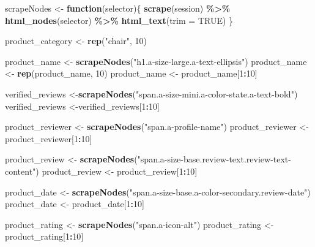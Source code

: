 \documentclass[
]{article}
\newenvironment{Shaded}{\begin{snugshade}}{\end{snugshade}}
\newcommand{\AttributeTok}[1]{\textcolor[rgb]{0.13,0.29,0.53}{#1}}
\newcommand{\ConstantTok}[1]{\textcolor[rgb]{0.56,0.35,0.01}{#1}}
\newcommand{\ControlFlowTok}[1]{\textcolor[rgb]{0.13,0.29,0.53}{\textbf{#1}}}
\newcommand{\DecValTok}[1]{\textcolor[rgb]{0.00,0.00,0.81}{#1}}
\newcommand{\FunctionTok}[1]{\textcolor[rgb]{0.13,0.29,0.53}{\textbf{#1}}}
\newcommand{\NormalTok}[1]{#1}
\newcommand{\OtherTok}[1]{\textcolor[rgb]{0.56,0.35,0.01}{#1}}
\newcommand{\SpecialCharTok}[1]{\textcolor[rgb]{0.81,0.36,0.00}{\textbf{#1}}}
\newcommand{\StringTok}[1]{\textcolor[rgb]{0.31,0.60,0.02}{#1}}
\begin{document}
\begin{Shaded}
\begin{Highlighting}[]
\NormalTok{  scrapeNodes }\OtherTok{\textless{}{-}} \ControlFlowTok{function}\NormalTok{(selector)\{}
    \FunctionTok{scrape}\NormalTok{(session) }\SpecialCharTok{\%\textgreater{}\%}
      \FunctionTok{html\_nodes}\NormalTok{(selector) }\SpecialCharTok{\%\textgreater{}\%}
      \FunctionTok{html\_text}\NormalTok{(}\AttributeTok{trim =} \ConstantTok{TRUE}\NormalTok{)}
\NormalTok{  \}}

\NormalTok{  product\_category }\OtherTok{\textless{}{-}} \FunctionTok{rep}\NormalTok{(}\StringTok{"chair"}\NormalTok{, }\DecValTok{10}\NormalTok{)}

\NormalTok{  product\_name }\OtherTok{\textless{}{-}} \FunctionTok{scrapeNodes}\NormalTok{(}\StringTok{"h1.a{-}size{-}large.a{-}text{-}ellipsis"}\NormalTok{)}
\NormalTok{  product\_name }\OtherTok{\textless{}{-}} \FunctionTok{rep}\NormalTok{(product\_name, }\DecValTok{10}\NormalTok{)}
\NormalTok{  product\_name }\OtherTok{\textless{}{-}}\NormalTok{ product\_name[}\DecValTok{1}\SpecialCharTok{:}\DecValTok{10}\NormalTok{]}
  
\NormalTok{  verified\_reviews }\OtherTok{\textless{}{-}}\FunctionTok{scrapeNodes}\NormalTok{(}\StringTok{"span.a{-}size{-}mini.a{-}color{-}state.a{-}text{-}bold"}\NormalTok{)}
\NormalTok{  verified\_reviews }\OtherTok{\textless{}{-}}\NormalTok{verified\_reviews[}\DecValTok{1}\SpecialCharTok{:}\DecValTok{10}\NormalTok{]}
  
\NormalTok{  product\_reviewer }\OtherTok{\textless{}{-}} \FunctionTok{scrapeNodes}\NormalTok{(}\StringTok{"span.a{-}profile{-}name"}\NormalTok{)}
\NormalTok{  product\_reviewer }\OtherTok{\textless{}{-}}\NormalTok{ product\_reviewer[}\DecValTok{1}\SpecialCharTok{:}\DecValTok{10}\NormalTok{]}
  
\NormalTok{  product\_review }\OtherTok{\textless{}{-}} \FunctionTok{scrapeNodes}\NormalTok{(}\StringTok{"span.a{-}size{-}base.review{-}text.review{-}text{-}content"}\NormalTok{)}
\NormalTok{  product\_review }\OtherTok{\textless{}{-}}\NormalTok{ product\_review[}\DecValTok{1}\SpecialCharTok{:}\DecValTok{10}\NormalTok{]}
  
\NormalTok{  product\_date }\OtherTok{\textless{}{-}} \FunctionTok{scrapeNodes}\NormalTok{(}\StringTok{"span.a{-}size{-}base.a{-}color{-}secondary.review{-}date"}\NormalTok{)}
\NormalTok{  product\_date }\OtherTok{\textless{}{-}}\NormalTok{ product\_date[}\DecValTok{1}\SpecialCharTok{:}\DecValTok{10}\NormalTok{]}
  
\NormalTok{  product\_rating }\OtherTok{\textless{}{-}} \FunctionTok{scrapeNodes}\NormalTok{(}\StringTok{"span.a{-}icon{-}alt"}\NormalTok{)}
\NormalTok{  product\_rating }\OtherTok{\textless{}{-}}\NormalTok{ product\_rating[}\DecValTok{1}\SpecialCharTok{:}\DecValTok{10}\NormalTok{]}
  

\end{Highlighting}
\end{Shaded}
\end{document}
